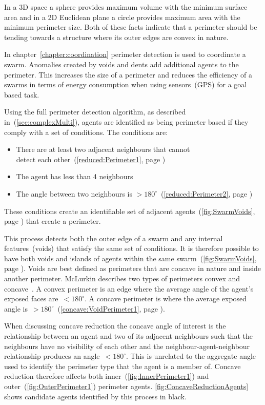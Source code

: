 In a 3D space a sphere provides maximum volume with the minimum surface area and in a 2D Euclidean plane a circle provides maximum area with the minimum perimeter size. Both of these facts indicate that a perimeter should be tending towards a structure where its outer edges are convex in nature. 

In chapter~\ref{chapter:coordination} perimeter detection is used to coordinate a swarm. Anomalies created by voids and dents add additional agents to the perimeter. This increases the size of a perimeter and reduces the efficiency of a swarms in terms of energy consumption when using sensors~(GPS) for a goal based task. 
 
Using the full perimeter detection algorithm, as described in~(\autoref{sec:complexMulti}), agents are identified as being perimeter based if they comply with a set of conditions. The conditions are: 
\begin{itemize}
  \item There are at least two adjacent neighbours that cannot\\detect each other~(\autoref{reduced:Perimeter1}, page \pageref{reduced:Perimeter1})
  \item The agent has less than 4 neighbours
  \item The angle between two neighbours is $> 180^\circ$~(\autoref{reduced:Perimeter2}, page \pageref{reduced:Perimeter2})
\end{itemize} 
These conditions create an identifiable set of adjacent agents~(\autoref{fig:SwarmVoids}, page \pageref{fig:SwarmVoids}) that create a perimeter.

This process detects both the outer edge of a swarm and any internal features~(voids) that satisfy the same set of conditions. It is therefore possible to have both voids and islands of agents within the same swarm~(\autoref{fig:SwarmVoids}, page \pageref{fig:SwarmVoids}). Voids are best defined as perimeters that are concave in nature and inside another perimeter. McLurkin describes two types of perimeters convex and concave~\cite{MD:09}. A convex perimeter is an edge where the average angle of the agent's exposed faces are~$< 180^\circ$. A concave perimeter is where the average exposed angle is~$> 180^\circ$~(\autoref{concave:VoidPerimeter1}, page \pageref{concave:VoidPerimeter1}).
 
When discussing concave reduction the concave angle of interest is the relationship between an agent and two of its adjacent neighbours such that the neighbours have no visibility of each other and the neighbour-agent-neighbour relationship produces an angle~$< 180^\circ$. This is unrelated to the aggregate angle used to identify the perimeter type that the agent is a member of. Concave reduction therefore affects both inner~(\autoref{fig:InnerPerimeter1}) and outer~(\autoref{fig:OuterPerimeter1}) perimeter agents. \autoref{fig:ConcaveReductionAgents} shows candidate agents identified by this process in black. 

